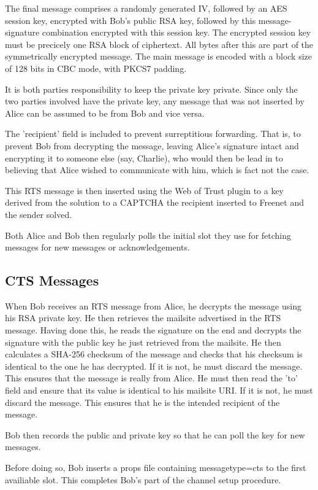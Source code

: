 \documentclass[12pt,a4paper]{article}
\begin{document}
The final message comprises a randomly generated IV, followed by an AES session key, encrypted with
Bob's public RSA key, followed by this message-signature combination encrypted with this session
key. The encrypted session key must be precicely one RSA block of ciphertext. All bytes after this
are part of the symmetrically encrypted message. The main message is encoded with a block size of
128 bits in CBC mode, with PKCS7 padding.

It is both parties responsibility to keep the private key private. Since only the two parties
involved have the private key, any message that was not inserted by Alice can be assumed to be from
Bob and vice versa.

The 'recipient' field is included to prevent surreptitious forwarding. That is, to prevent Bob from
decrypting the message, leaving Alice's signature intact and encrypting it to someone else (say,
Charlie), who would then be lead in to believing that Alice wished to communicate with him, which is
fact not the case.

This RTS message is then inserted using the Web of Trust plugin to a key derived from the solution
to a CAPTCHA the recipient inserted to Freenet and the sender solved.

Both Alice and Bob then regularly polls the initial slot they use for fetching messages for new
messages or acknowledgements.

\subsection{CTS Messages}
When Bob receives an RTS message from Alice, he decrypts the message using his RSA private key. He
then retrieves the mailsite advertised in the RTS message. Having done this, he reads the signature
on the end and decrypts the signature with the public key he just retrieved from the mailsite. He
then calculates a SHA-256 checksum of the message and checks that his checksum is identical to the
one he has decrypted. If it is not, he must discard the message. This ensures that the message is
really from Alice. He must then read the 'to' field and ensure that its value is identical to his
mailsite URI. If it is not, he must discard the message. This ensures that he is the intended
recipient of the message.

Bob then records the public and private key so that he can poll the key for new messages.

Before doing so, Bob inserts a props file containing messagetype=cts to the first availiable slot.
This completes Bob's part of the channel setup procedure.
\end{document}
